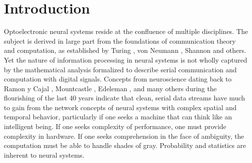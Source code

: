 \documentclass[twocolumn]{article}
\begin{document}
\vspace{3em}

\setcounter{tocdepth}{4}
\setcounter{secnumdepth}{4}
\tableofcontents

\section{\label{sec:introduction}Introduction}
Optoelectronic neural systems reside at the confluence of multiple disciplines. The subject is derived in large part from the foundations of communication theory and computation, as established by Turing \cite{tu1936}, von Neumann \cite{ne1945}, Shannon \cite{sh1948} and others. Yet the nature of information processing in neural systems is not wholly captured by the mathematical analysis formalized to describe serial communication and computation with digital signals. Concepts from neuroscience dating back to Ramon y Cajal \cite{}, Mountcastle \cite{}, Edeleman \cite{}, and many others during the flourishing of the last 40 years indicate that clean, serial data streams have much to gain from the network concepts of neural systems with complex spatial and temporal behavior, particularly if one seeks a machine that can think like an intelligent being. If one seeks complexity of performance, one must provide complexity in hardware. If one seeks comprehension in the face of ambiguity, the computation must be able to handle shades of gray. Probability and statistics are inherent to neural systems. 
\end{document}
